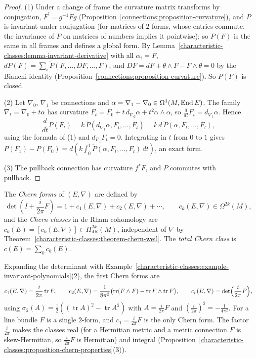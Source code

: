 \begin{proof}
(1) Under a change of frame the curvature matrix transforms by conjugation, $F^{\prime} = g^{-1}Fg$ (Proposition~\ref{connections:proposition-curvature}), and $P$ is invariant under
conjugation (for matrices of $2$-forms, whose entries commute, the invariance of $P$ on matrices of numbers implies it pointwise); so $P(F)$ is the same in all frames and defines a
global form. By Lemma~\ref{characteristic-classes:lemma-invariant-derivative} with all $\alpha_i = F$, $dP(F) = \sum_i\tilde P(F, \ldots, DF, \ldots, F)$, and $DF = dF + \theta \wedge F - F \wedge \theta = 0$
by the Bianchi identity (Proposition~\ref{connections:proposition-curvature}). So $P(F)$ is closed.

(2) Let $\nabla_0$, $\nabla_1$ be connections and $\alpha = \nabla_1 - \nabla_0 \in \Omega^1(M, \operatorname{End} E)$. The family $\nabla_t = \nabla_0 + t\alpha$ has curvature $F_t = F_0 + t\,d_{\nabla_0}\alpha + t^2\alpha \wedge \alpha$, so
$\frac{d}{dt}F_t = d_{\nabla_t}\alpha$. Hence
\[
\frac{d}{dt}P(F_t) = k\,\tilde{P}(d_{\nabla_t}\alpha, F_t, \ldots, F_t) = k\,d\,\tilde{P}(\alpha, F_t, \ldots, F_t),
\]
using the formula of (1) and $d_{\nabla_t}F_t = 0$. Integrating in $t$ from $0$ to $1$ gives $P(F_1) - P(F_0) = d\left(k\int_0^1\tilde{P}(\alpha, F_t, \ldots, F_t)\,dt\right)$, an exact form.

(3) The pullback connection has curvature $f^*F$, and $P$ commutes with pullback.
\end{proof}

\begin{definition}\label{characteristic-classes:definition-chern-forms}
The \emph{Chern forms} of $(E, \nabla)$ are defined by
\[
\det\left(I + \frac{i}{2\pi}F\right) = 1 + c_1(E, \nabla) + c_2(E, \nabla) + \cdots, \qquad c_k(E, \nabla) \in \Omega^{2k}(M),
\]
and the \emph{Chern classes} in de Rham cohomology are $c_k(E) = [c_k(E, \nabla)] \in H^{2k}_{\mathrm{dR}}(M)$, independent of $\nabla$ by Theorem~\ref{characteristic-classes:theorem-chern-weil}. The
\emph{total Chern class} is $c(E) = \sum_kc_k(E)$.
\end{definition}

Expanding the determinant with Example~\ref{characteristic-classes:example-invariant-polynomials}(2), the first Chern forms are
\[
c_1(E, \nabla) = \frac{i}{2\pi}\operatorname{tr}F, \qquad c_2(E, \nabla) = \frac{1}{8\pi^2}\bigl(\operatorname{tr}(F \wedge F) - \operatorname{tr}F \wedge \operatorname{tr}F\bigr), \qquad
c_r(E, \nabla) = \det\Bigl(\frac{i}{2\pi}F\Bigr),
\]
using $\sigma_2(A) = \frac12((\operatorname{tr}A)^2 - \operatorname{tr}A^2)$ with $A = \frac{i}{2\pi}F$ and $(\frac{i}{2\pi})^2 = -\frac{1}{4\pi^2}$. For a line bundle $F$ is a single $2$-form, and
$c_1 = \frac{i}{2\pi}F$ is the only Chern form. The factor $\frac{i}{2\pi}$ makes the classes real (for a Hermitian metric and a metric connection $F$ is skew-Hermitian, so
$\frac{i}{2\pi}F$ is Hermitian) and integral (Proposition~\ref{characteristic-classes:proposition-chern-properties}(3)).

